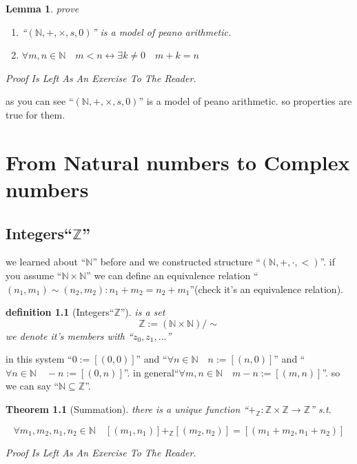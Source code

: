 \documentclass[10pt,a4paper]{book}
\newtheorem{definition}{definition}[section]
\newtheorem{theorem}{Theorem}[section]
\newtheorem{lemma}{Lemma}[section]
\begin{document}
\begin{lemma}prove
    \begin{enumerate}
        \setlength{\itemsep}{0pt} %
        \item       ``$(\mathbb{N} , + , \times , s , 0)$'' is a model of peano arithmetic.
        \item       $\forall m,n \in \mathbb{N} \quad m < n \leftrightarrow \exists k \not=0 \quad m + k = n  $
    \end{enumerate}
    Proof Is Left As An Exercise To The Reader.
\end{lemma}





as you can see ``$(\mathbb{N} , + , \times , s , 0)$'' is a model of peano
arithmetic. so properties are true for them.

\chapter{From Natural numbers to Complex numbers }

\section{Integers``$\mathbb{Z}$''}

we learned about ``$\mathbb{N}$'' before and we constructed structure
``$(\mathbb{N} , + , \cdot , <)$''. if you assume ``$\mathbb{N} \times
    \mathbb{N}$'' we can define an equivalence relation ``$ (n_1 , m_1) \sim (n_2 ,
    m_2) : n_1 + m_2 = n_2 + m_1 $''(check it's an equivalence relation).

\begin{definition}[Integers``$\mathbb{Z}$''] is a set
    \[ \mathbb{Z} := (\mathbb{N} \times \mathbb{N}) / \sim  \]
    we denote it's members with ``$z_0 , z_1 ,...$''
\end{definition}

in this system ``$ 0 := [(0,0)]$'' and ``$ \forall n \in \mathbb{N} \quad n :=
        [(n,0)]$'' and ``$\forall n \in \mathbb{N} \quad -n := [(0,n)]$''. in
general``$\forall m,n \in \mathbb{N} \quad m-n := [(m,n)]$''. so we can say ``$
    \mathbb{N} \subseteq \mathbb{Z}$''.

\begin{theorem}[Summation] there is a unique function ``$+_\mathbb{Z} :\mathbb{Z} \times \mathbb{Z} \to \mathbb{Z}$'' s.t.

    \[ \forall m_1 , m_2 , n_1 , n_2 \in \mathbb{N} \quad [(m_1 , n_1)] +_\mathbb{Z}  [(m_2 , n_2)]  = [(m_1 + m_2, n_1 + n_2)] \]

    Proof Is Left As An Exercise To The Reader.
\end{theorem}
\end{document}
